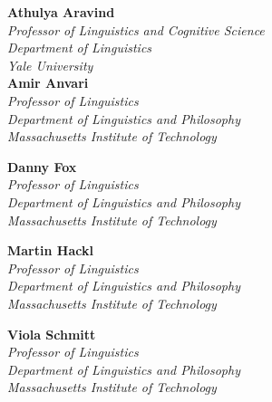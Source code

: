 \begin{flushright}



 \textbf{Athulya Aravind} \\
 {\itshape
 Professor of Linguistics and Cognitive Science \\
 Department of Linguistics \\
 Yale University \\
 }
 \textbf{Amir Anvari} \\
 {\itshape
 	Professor of Linguistics \\
 	Department of Linguistics and Philosophy \\
 	Massachusetts Institute of Technology\\
 }


 \textbf{Danny Fox} \\
 {\itshape
   Professor of Linguistics \\
   Department of Linguistics and Philosophy \\
   Massachusetts Institute of Technology\\[18pt]
 }
 
 \textbf{Martin Hackl} \\
 {\itshape
 	Professor of Linguistics \\
 	Department of Linguistics and Philosophy \\
 	Massachusetts Institute of Technology\\[18pt]
 }
 
 \textbf{Viola Schmitt} \\
 {\itshape
 	Professor of Linguistics \\
	 Department of Linguistics and Philosophy \\
	 Massachusetts Institute of Technology\\[18pt]
 }


\end{flushright}

\cleardoublepage
